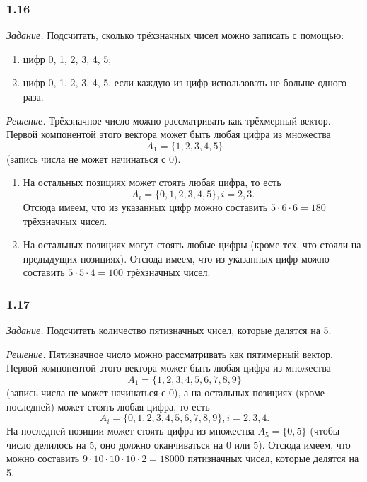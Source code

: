 \subsubsection*{1.16}

\textit{Задание.} Подсчитать, сколько трёхзначных чисел можно записать с помощью:
\begin{enumerate}[label=\alph*)]
\item цифр 0, 1, 2, 3, 4, 5;
\item цифр 0, 1, 2, 3, 4, 5, если каждую из цифр использовать не больше одного раза.
\end{enumerate}

\textit{Решение.} Трёхзначное число можно рассматривать как трёхмерный вектор.
Первой компонентой этого вектора может быть любая цифра из множества
$$ A_1 = \{ 1, 2, 3, 4, 5 \} $$
(запись числа не может начинаться с 0).

\begin{enumerate}[label=\alph*)]
\item На остальных позициях может стоять любая цифра, то есть
$$ A_i = \{ 0, 1, 2, 3, 4, 5 \}, i = 2, 3.$$
Отсюда имеем, что из указанных цифр можно составить $ 5 \cdot 6 \cdot 6 = 180$ трёхзначных чисел.

\item На остальных позициях могут стоять любые цифры (кроме тех, что стояли на предыдущих позициях).
Отсюда имеем, что из указанных цифр можно составить $ 5 \cdot 5 \cdot 4 = 100 $ трёхзначных чисел.
\end{enumerate}

\subsubsection*{1.17}

\textit{Задание.} Подсчитать количество пятизначных чисел, которые делятся на 5.

\textit{Решение.} Пятизначное число можно рассматривать как пятимерный вектор.
Первой компонентой этого вектора может быть любая цифра из множества
$$ A_1 = \{ 1, 2, 3, 4, 5, 6, 7, 8, 9 \} $$
(запись числа не может начинаться с 0), а на остальных позициях (кроме последней) может стоять любая цифра, то есть
$$ A_i = \{ 0, 1, 2, 3, 4, 5, 6, 7, 8, 9 \}, i = 2, 3, 4.$$
На последней позиции может стоять цифра из множества $ A_5 = \{ 0, 5 \}$ (чтобы число делилось на 5, оно должно оканчиваться на 0 или 5).
Отсюда имеем, что можно составить $ 9 \cdot 10 \cdot 10 \cdot 10 \cdot 2 = 18000$ пятизначных чисел, которые делятся на 5.


